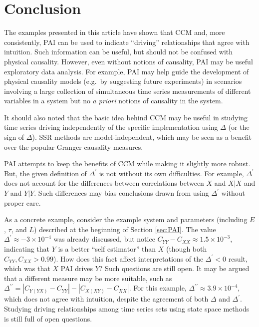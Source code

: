 \documentclass[twocolumn,aps,pre,groupedaddress]{revtex4-1}
\begin{document}
\section{Conclusion}
The examples presented in this article have shown that CCM and, more consistently, PAI can be used to indicate ``driving'' relationships that agree with intuition.  Such information can be useful, but should not be confused with physical causality.  However, even without notions of causality, PAI may be useful exploratory data analysis.  For example, PAI may help guide the development of physical causality models (e.g.\ by suggesting future experiments) in scenarios involving a large collection of simultaneous time series measurements of different variables in a system but no {\em a priori} notions of causality in the system.

It should also noted that the basic idea behind CCM may be useful in studying time series driving independently of the specific implementation using $\Delta$ (or the sign of $\Delta$). SSR methods are model-independent, which may be seen as a benefit over the popular Granger causality measures.  

PAI attempts to keep the benefits of CCM while making it slightly more robust.  But, the given definition of $\Delta^\prime$ is not without its own difficulties.  For example, $\Delta^\prime$ does not account for the differences between correlations between $X$ and $X|X$ and $Y$ and $Y|Y$.  Such differences may bias conclusions drawn from using $\Delta^\prime$ without proper care.  

As a concrete example, consider the example system and parameters (including $E$, $\tau$, and $L$) described at the beginning of Section \ref{sec:PAI}.  The value $\Delta^\prime \approx -3\times 10^{-4}$ was already discussed, but notice $C_{YY}-C_{XX} \approx 1.5\times10^{-3}$, indicating that $Y$ is a better ``self estimator'' than $X$ (though both $C_{YY},C_{XX}>0.99$).  How does this fact affect interpretations of the $\Delta^\prime<0$ result, which was that $X$ PAI drives $Y$?  Such questions are still open.  It may be argued that a different measure may be more suitable, such as $\Delta^{\prime\prime} = |C_{Y(YX)}-C_{YY}|-|C_{X(XY)}-C_{XX}|$.  For this example, $\Delta^{\prime\prime} \approx 3.9\times 10^{-4}$, which does not agree with intuition, despite the agreement of both $\Delta$ and $\Delta^\prime$.  Studying driving relationships among time series sets using state space methods is still full of open questions.
\end{document}
